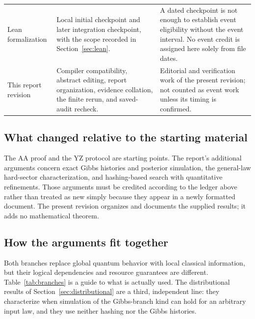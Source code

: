 \documentclass[11pt]{article}
\theoremstyle{definition}\newtheorem{definition}[theorem]{Definition}
\theoremstyle{remark}\newtheorem{remark}[theorem]{Remark}
\begin{document}
\begin{longtable}{@{}>{\raggedright\arraybackslash}p{}>{\raggedright\arraybackslash}p{}>{\raggedright\arraybackslash}p{}@{}}
Lean formalization & Local initial checkpoint and later integration checkpoint, with the scope recorded in Section~\ref{sec:lean}. & A dated checkpoint is not enough to establish event eligibility without the event interval. No event credit is assigned here solely from file dates.\\[5pt]
This report revision & Compiler compatibility, abstract editing, report organization, evidence collation, the finite rerun, and saved-audit recheck. & Editorial and verification work of the present revision; not counted as event work unless its timing is confirmed.\\
\end{longtable}
\endgroup

\subsection{What changed relative to the starting material}
The AA proof and the YZ protocol are starting points. The report's additional arguments concern exact Gibbs histories and posterior simulation, the general-law hard-sector characterization, and hashing-based search with quantitative refinements. Those arguments must be credited according to the ledger above rather than treated as new simply because they appear in a newly formatted document. The present revision organizes and documents the supplied results; it adds no mathematical theorem.

\subsection{How the arguments fit together}\label{sec:connections}
Both branches replace global quantum behavior with local classical information, but their logical dependencies and resource guarantees are different. Table~\ref{tab:branches} is a guide to what is actually used. The distributional results of Section~\ref{sec:distributional} are a third, independent line: they characterize when simulation of the Gibbs-branch kind can hold for an arbitrary input law, and they use neither hashing nor the Gibbs histories.
\end{document}
